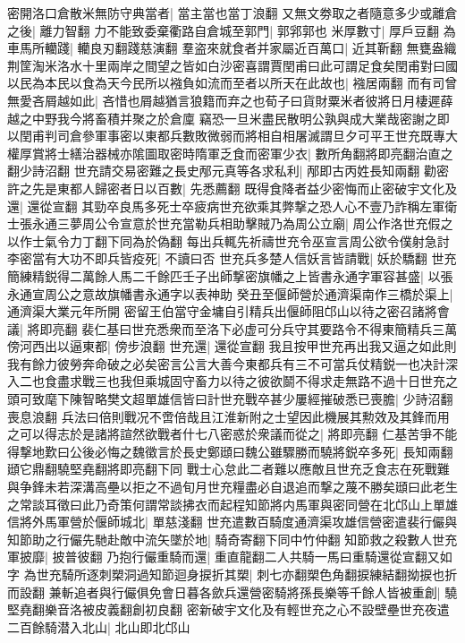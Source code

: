密開洛口倉散米無防守典當者|{
	當主當也當丁浪翻}
又無文劵取之者隨意多少或離倉之後|{
	離力智翻}
力不能致委棄衢路自倉城至郭門|{
	郭郛郭也}
米厚數寸|{
	厚戶豆翻}
為車馬所轥踐|{
	轥良刃翻踐慈演翻}
羣盗來就食者并家屬近百萬口|{
	近其靳翻}
無甕盎織荆筐淘米洛水十里兩岸之間望之皆如白沙密喜謂賈閏甫曰此可謂足食矣閏甫對曰國以民為本民以食為天今民所以襁負如流而至者以所天在此故也|{
	襁居兩翻}
而有司曾無愛吝屑越如此|{
	吝惜也屑越猶言狼籍而弃之也荀子曰貨財粟米者彼將日月棲遲薛越之中野我今將畜積并聚之於倉廩}
竊恐一旦米盡民散明公孰與成大業哉密謝之即以閏甫判司倉參軍事密以東都兵數敗微弱而將相自相屠滅謂旦夕可平王世充既專大權厚賞將士繕治器械亦隂圖取密時隋軍乏食而密軍少衣|{
	數所角翻將即亮翻治直之翻少詩沼翻}
世充請交易密難之長史邴元真等各求私利|{
	邴即古丙姓長知兩翻}
勸密許之先是東都人歸密者日以百數|{
	先悉薦翻}
既得食降者益少密悔而止密破宇文化及還|{
	還從宣翻}
其勁卒良馬多死士卒疲病世充欲乘其弊撃之恐人心不壹乃詐稱左軍衛士張永通三夢周公令宣意於世充當勒兵相助擊賊乃為周公立廟|{
	周公作洛世充假之以作士氣令力丁翻下同為於偽翻}
每出兵輒先祈禱世充令巫宣言周公欲令僕射急討李密當有大功不即兵皆疫死|{
	不讀曰否}
世充兵多楚人信妖言皆請戰|{
	妖於驕翻}
世充簡練精鋭得二萬餘人馬二千餘匹壬子出師撃密旗幡之上皆書永通字軍容甚盛|{
	以張永通宣周公之意故旗幡書永通字以表神助}
癸丑至偃師營於通濟渠南作三橋於渠上|{
	通濟渠大業元年所開}
密留王伯當守金墉自引精兵出偃師阻邙山以待之密召諸將會議|{
	將即亮翻}
裴仁基曰世充悉衆而至洛下必虚可分兵守其要路令不得東簡精兵三萬傍河西出以逼東都|{
	傍步浪翻}
世充還|{
	還從宣翻}
我且按甲世充再出我又逼之如此則我有餘力彼勞奔命破之必矣密言公言大善今東都兵有三不可當兵仗精鋭一也决計深入二也食盡求戰三也我但乘城固守畜力以待之彼欲鬬不得求走無路不過十日世充之頭可致麾下陳智略樊文超單雄信皆曰計世充戰卒甚少屢經摧破悉已喪膽|{
	少詩沼翻喪息浪翻}
兵法曰倍則戰况不啻倍哉且江淮新附之士望因此機展其勲效及其鋒而用之可以得志於是諸將諠然欲戰者什七八密惑於衆議而從之|{
	將即亮翻}
仁基苦爭不能得撃地歎曰公後必悔之魏徵言於長史鄭頲曰魏公雖驟勝而驍將鋭卒多死|{
	長知兩翻頲它鼎翻驍堅堯翻將即亮翻下同}
戰士心怠此二者難以應敵且世充乏食志在死戰難與争鋒未若深溝高壘以拒之不過旬月世充糧盡必自退追而撃之蔑不勝矣頲曰此老生之常談耳徵曰此乃奇策何謂常談拂衣而起程知節將内馬軍與密同營在北邙山上單雄信將外馬軍營於偃師城北|{
	單慈淺翻}
世充遣數百騎度通濟渠攻雄信營密遣裴行儼與知節助之行儼先馳赴敵中流矢墜於地|{
	騎奇寄翻下同中竹仲翻}
知節救之殺數人世充軍披靡|{
	披普彼翻}
乃抱行儼重騎而還|{
	重直龍翻二人共騎一馬曰重騎還從宣翻又如字}
為世充騎所逐刺槊洞過知節迴身捩折其槊|{
	刺七亦翻槊色角翻捩練結翻拗捩也折而設翻}
兼斬追者與行儼俱免會日暮各歛兵還營密騎將孫長樂等千餘人皆被重創|{
	驍堅堯翻樂音洛被皮義翻創初良翻}
密新破宇文化及有輕世充之心不設壁壘世充夜遣二百餘騎潜入北山|{
	北山即北邙山}
